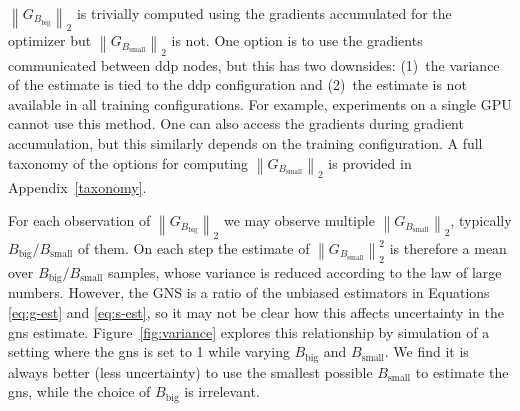 \documentclass{article}
\newcommand{\Bbig}{B_{\textrm{big}}}
\newcommand{\Bsmall}{B_{\textrm{small}}}
\newcommand{\Gbig}{G_{B_{\textrm{big}}}} %
\newcommand{\Gsmall}{G_{B_{\textrm{small}}}} %
\newcommand{\sqn}[1]{\left\lVert#1\right\rVert_2^2}
\newcommand{\norm}[1]{\left\lVert#1\right\rVert_2}
\begin{document}
$\norm{\Gbig}$ is trivially computed using the gradients accumulated for the
optimizer but $\norm{\Gsmall}$ is not. One option is to use the gradients
communicated between \ac{ddp} nodes, but this has two downsides: (1)~the variance of
the estimate is tied to the \ac{ddp} configuration and (2)~the estimate is not
available in all training configurations. For example, experiments on a single
GPU cannot use this method. One can also access the gradients during gradient
accumulation, but this similarly depends on the training configuration.
A full taxonomy of the options for computing $\norm{\Gsmall}$ is provided in
Appendix~\ref{taxonomy}.

For each observation of $\norm{\Gbig}$ we may observe multiple $\norm{\Gsmall}$,
typically $\Bbig / \Bsmall$ of them. On each step the estimate of
$\sqn{\Gsmall}$ is therefore a mean over $\Bbig / \Bsmall$ samples, whose
variance is reduced according to the law of large numbers. However, the GNS is
a ratio of the unbiased estimators in Equations \ref{eq:g-est} and
\ref{eq:s-est}, so it may not be clear how this affects uncertainty in the \ac{gns}
estimate. Figure~\ref{fig:variance} explores this
relationship by simulation of a setting where the \ac{gns} is set to 1 while
varying $\Bbig$ and $\Bsmall$. We find it is always better (less
uncertainty) to use the smallest possible $\Bsmall$ to estimate the \ac{gns},
while the choice of $\Bbig$ is irrelevant.
\end{document}
